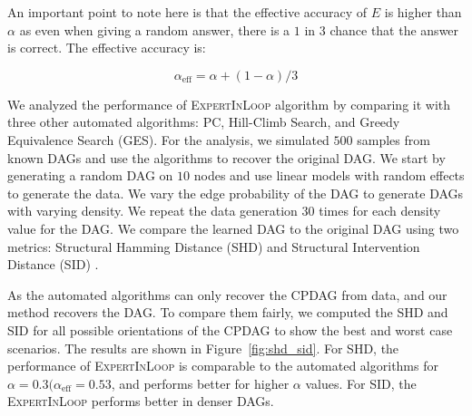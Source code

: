 \documentclass{uai2025} %
\begin{document}
An important point to note here is that the effective accuracy of $ E $ is
higher than $ \alpha $ as even when giving a random answer, there is a $ 1 $ in
$ 3 $ chance that the answer is correct. The effective accuracy is:

\begin{equation}
	\alpha_{\mathrm{eff}} = \alpha + (1 - \alpha) / 3
\end{equation}


We analyzed the performance of \textsc{ExpertInLoop} algorithm by comparing it
with three other automated algorithms: PC, Hill-Climb Search, and Greedy
Equivalence Search (GES). For the analysis, we simulated $ 500 $ samples from
known DAGs and use the algorithms to recover the original DAG. We start by
generating a random DAG on $10$ nodes and use linear models with random effects
to generate the data. We vary the edge probability of the DAG to generate DAGs
with varying density. We repeat the data generation $30$ times for each density
value for the DAG. We compare the learned DAG to the original DAG using two
metrics: Structural Hamming Distance (SHD) and Structural Intervention Distance
(SID) \citep{Peters2015}.


As the automated algorithms can only recover the CPDAG from data, and our
method recovers the DAG. To compare them fairly, we computed the SHD and SID
for all possible orientations of the CPDAG to show the best and worst case
scenarios. The results are shown in Figure~\ref{fig:shd_sid}. For SHD, the
performance of \textsc{ExpertInLoop} is comparable to the automated algorithms
for $ \alpha = 0.3 (\alpha_{\textrm{eff}} = 0.53 $, and performs better for
higher $ \alpha $ values. For SID, the \textsc{ExpertInLoop} performs better in
denser DAGs.

% 	
% 	
% 
\end{document}
